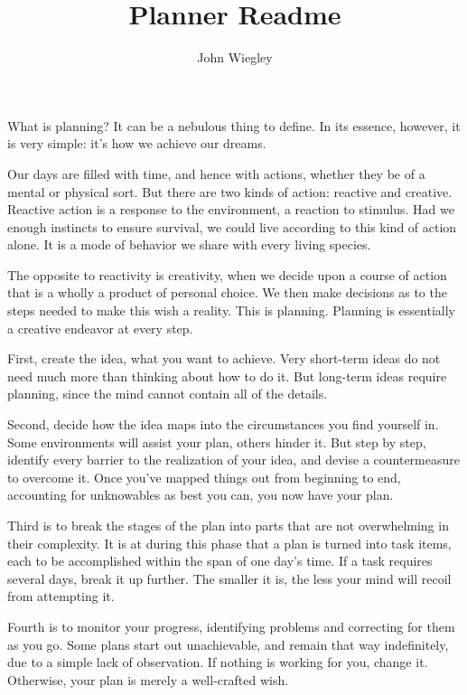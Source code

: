 \documentclass[12pt,a4paper,onecolumn]{article}
\title{Planner Readme}
\author{John Wiegley}
\begin{document}
\date{}
\maketitle
\begin{sffamily}

What is planning? It can be a nebulous thing to define. In its essence, however, it is very simple:
it's how we achieve our dreams.

Our days are filled with time, and hence with actions, whether they be of a mental or physical sort.
But there are two kinds of action: reactive and creative. Reactive action is a response to the
environment, a reaction to stimulus. Had we enough instincts to ensure survival, we could live
according to this kind of action alone. It is a mode of behavior we share with every living species.

The opposite to reactivity is creativity, when we decide upon a course of action that is a wholly a
product of personal choice. We then make decisions as to the steps needed to make this wish a
reality. This is planning. Planning is essentially a creative endeavor at every step.

First, create the idea, what you want to achieve. Very short-term ideas do not need much more than
thinking about how to do it. But long-term ideas require planning, since the mind cannot contain all
of the details.

Second, decide how the idea maps into the circumstances you find yourself in. Some environments will
assist your plan, others hinder it. But step by step, identify every barrier to the realization of
your idea, and devise a countermeasure to overcome it. Once you've mapped things out from beginning
to end, accounting for unknowables as best you can, you now have your plan.

Third is to break the stages of the plan into parts that are not overwhelming in their complexity.
It is at during this phase that a plan is turned into task items, each to be accomplished within the
span of one day's time. If a task requires several days, break it up further. The smaller it is, the
less your mind will recoil from attempting it.

Fourth is to monitor your progress, identifying problems and correcting for them as you go. Some
plans start out unachievable, and remain that way indefinitely, due to a simple lack of observation.
If nothing is working for you, change it. Otherwise, your plan is merely a well-crafted wish.


\end{sffamily}
\end{document}
